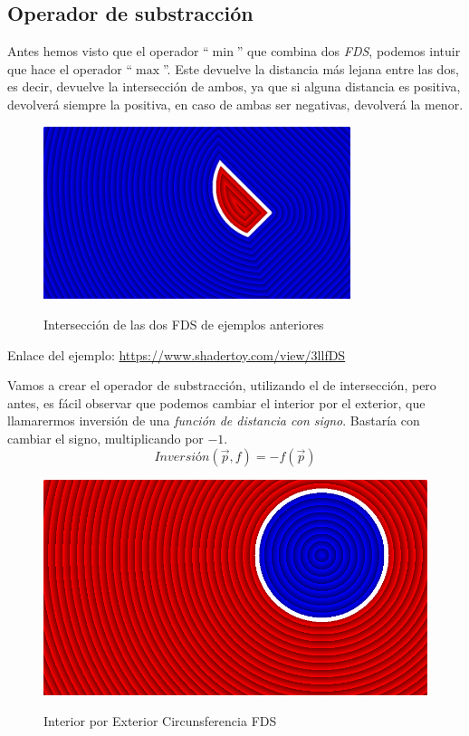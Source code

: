 \subsection{Operador de substracción}
Antes hemos visto que el operador \enquote{\(\min\)} que combina dos \textit{FDS}, podemos intuir que hace el operador \enquote{\(\max\)}. Este devuelve la distancia más lejana entre las dos, es decir, devuelve la intersección de ambos, ya que si alguna distancia es positiva, devolverá siempre la positiva, en caso de ambas ser negativas, devolverá la menor.

\begin{figure}[H]
  \centering
  \captionsetup{justification=centering}%
  \includegraphics[width=0.8\textwidth]{secciones/imagenes/sdf/2d/sdf_subtract-1.png}\label{fig:disyunccion}
  \caption{Intersección de las dos FDS de ejemplos anteriores}
\end{figure}

Enlace del ejemplo:
\url{https://www.shadertoy.com/view/3llfDS}

Vamos a crear el operador de substracción, utilizando el de intersección, pero antes, es fácil observar que podemos cambiar el interior por el exterior, que llamarermos inversión de una \textit{función de distancia con signo}. Bastaría con cambiar el signo, multiplicando por \(-1\).
\[ Inversión(\Vec{p}, f) = -f(\Vec{p}) \]

\begin{figure}[H]
  \centering
  \captionsetup{justification=centering}%
  \includegraphics[width=1.0\textwidth]{secciones/imagenes/sdf/2d/sdf_subtract-2.png}\label{fig:negative}
  \caption{ Interior por Exterior Circunsferencia FDS}
\end{figure}

